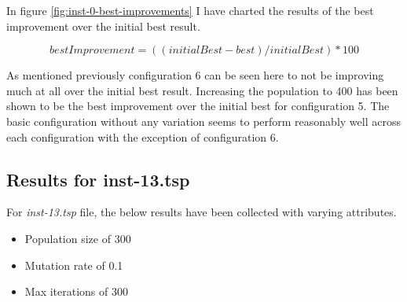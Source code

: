 In figure \ref{fig:inst-0-best-improvements} I have charted the results of the best improvement over the initial best result. 

\begin{equation}\label{eq:inst-0-best-improvement}
bestImprovement = ((initialBest - best) / initialBest) * 100
\end{equation}

As mentioned previously configuration 6 can be seen here to not be improving much at all over the initial best result. Increasing the population to 400 has been shown to be the best improvement over the initial best for configuration 5. The basic configuration without any variation seems to perform reasonably well across each configuration with the exception of configuration 6.

\subsection{Results for inst-13.tsp}

For \textit{inst-13.tsp} file, the below results have been collected with varying attributes.

\begin{itemize}
  \item Population size of 300
  \item Mutation rate of 0.1
  \item Max iterations of 300
\end{itemize}

